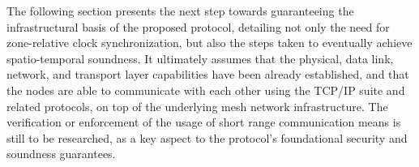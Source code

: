 The following section presents the next step towards guaranteeing the infrastructural basis of the proposed \pol{} protocol, detailing not only the need for zone-relative clock synchronization, but also the steps taken to eventually achieve spatio-temporal soundness. It ultimately assumes that the physical, data link, network, and transport layer capabilities have been already established, and that the nodes are able to communicate with each other using the TCP/IP suite and related protocols, on top of the underlying mesh network infrastructure. The verification or enforcement of the usage of short range communication means is still to be researched, as a key aspect to the protocol's foundational security and soundness guarantees.